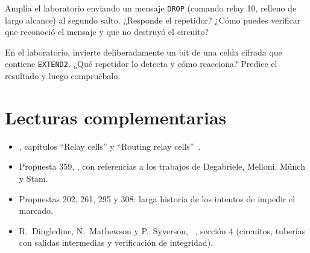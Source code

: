 \begin{esercizio}[3]\label{es:10-drop}
Amplía el laboratorio enviando un mensaje \texttt{DROP} (comando relay 10, relleno de largo alcance) al segundo salto. ¿Responde el repetidor? ¿Cómo puedes verificar que reconoció el mensaje y que no destruyó el circuito?
\end{esercizio}

\begin{esercizio}[3]\label{es:10-alterazione}
En el laboratorio, invierte deliberadamente un bit de una celda  cifrada que contiene \texttt{EXTEND2}. ¿Qué repetidor lo detecta y cómo reacciona? Predice el resultado y luego compruébalo.
\end{esercizio}

\section*{Lecturas complementarias}
\begin{itemize}
  \item {}, capítulos \enquote{Relay cells} y \enquote{Routing relay cells}~\cite{torspec}.
  \item Propuesta 359, , con referencias a los trabajos de Degabriele, Melloni, Münch y Stam.
  \item Propuestas 202, 261, 295 y 308: larga historia de los intentos de impedir el marcado.
  \item R.~Dingledine, N.~Mathewson y P.~Syverson, ~\cite{dingledine2004tor}, sección 4 (circuitos, tuberías con salidas intermedias y verificación de integridad).
\end{itemize}
